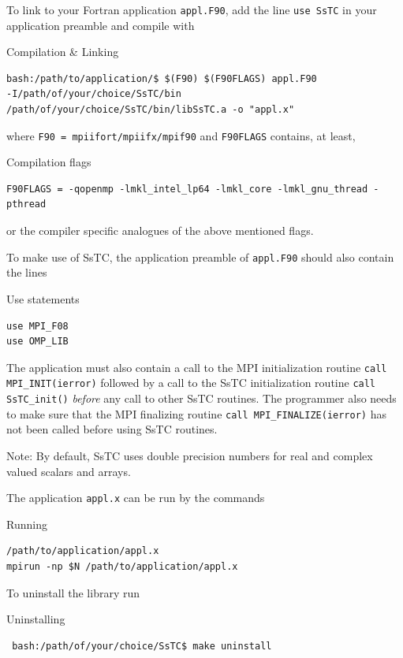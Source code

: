 \documentclass[10pt,a4paper]{article}
\begin{document}
To link to your Fortran application \verb|appl.F90|, add the line \verb|use SsTC| in your application preamble and compile with
\begin{codebox}{Compilation \& Linking}
\begin{verbatim}
bash:/path/to/application/$ $(F90) $(F90FLAGS) appl.F90
-I/path/of/your/choice/SsTC/bin
/path/of/your/choice/SsTC/bin/libSsTC.a -o "appl.x"
\end{verbatim}
\end{codebox}
where \verb|F90 = mpiifort/mpiifx/mpif90| and \verb|F90FLAGS| contains, at least,
\begin{codebox}{Compilation flags}
\begin{verbatim}
F90FLAGS = -qopenmp -lmkl_intel_lp64 -lmkl_core -lmkl_gnu_thread -pthread
\end{verbatim}
\end{codebox}
or the compiler specific analogues of the above mentioned flags.

To make use of SsTC, the application preamble of \verb|appl.F90| should also contain the lines
\begin{codebox}{Use statements}
\begin{verbatim}
use MPI_F08
use OMP_LIB
\end{verbatim}
\end{codebox}
The application must also contain a call to the MPI \cite{messagepassinginterfaceforumMPIMessagePassingInterface2021} initialization routine \verb|call MPI_INIT(ierror)| followed by a call to the SsTC initialization routine \verb|call SsTC_init()| \textit{before} any call to other SsTC routines. The programmer also needs to make sure that the MPI finalizing routine \verb|call MPI_FINALIZE(ierror)| has not been called before using SsTC routines.

Note:  By default, SsTC uses double precision numbers for real and complex valued scalars and arrays.

The application \verb|appl.x| can be run by the commands
\begin{codebox}{Running}
\begin{verbatim}
/path/to/application/appl.x
mpirun -np $N /path/to/application/appl.x
\end{verbatim}
\end{codebox}

To uninstall the library run
\begin{codebox}{Uninstalling}
\begin{verbatim}
 bash:/path/of/your/choice/SsTC$ make uninstall
\end{verbatim}
\end{codebox}
\end{document}
